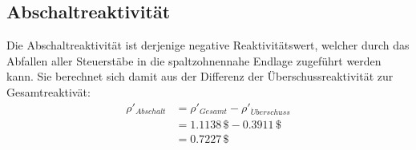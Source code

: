 \documentclass[12pt,german]{article}
\begin{document}
    \subsection{Abschaltreaktivität}
    Die Abschaltreaktivität ist derjenige negative Reaktivitätswert, welcher durch das Abfallen aller Steuerstäbe
    in die spaltzohnennahe Endlage zugeführt werden kann.
    Sie berechnet sich damit aus der Differenz der Überschussreaktivität zur Gesamtreaktivät:
    \begin{align*}
        \rho'_{Abschalt} &= \rho'_{Gesamt} - \rho'_{\ddot{U}berschuss} \\
        &= 1.1138\, \$ - 0.3911\, \$ \\
        &= 0.7227\, \$ \\
    \end{align*}


    
\end{document}
